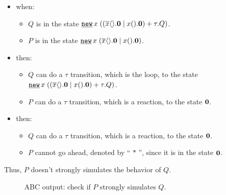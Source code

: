 \begin{itemize}
\item when:
	\begin{itemize}
	\item $Q$ is in the state $\procres{x}{(\procchoice{(\procpar{\out{x}{}.\proczero}{\inp{x}{}.\proczero})}{\tau.Q})}$.
	\item $P$ is in the state $\procres{x}{(\procpar{\out{x}{}.\proczero}{\inp{x}{}.\proczero})}$.
	\end{itemize}

\item then:
	\begin{itemize}
	\item $Q$ can do a $\tau$ transition, which is the loop, to the state $\procres{x}{(\procchoice{(\procpar{\out{x}{}.\proczero}{\inp{x}{}.\proczero})}{\tau.Q})}$.
	\item $P$ can do a $\tau$ transition, which is a reaction, to the state $\mathbf{0}$.
	\end{itemize}

\item then:
	\begin{itemize}
	\item $Q$ can do a $\tau$ transition, which is a reaction, to the state $\mathbf{0}$.
	\item $P$ cannot go ahead, denoted by `` $*$ '', since it is in the state $\mathbf{0}$.
	\end{itemize}
\end{itemize}


Thus, $P$ doesn't strongly simulates the behavior of $Q$.
\begin{figure}[H]

\caption{ABC output: check if $P$ strongly simulates $Q$.}
\label{pi_simulation_ABC_outputQsP}
\end{figure}

